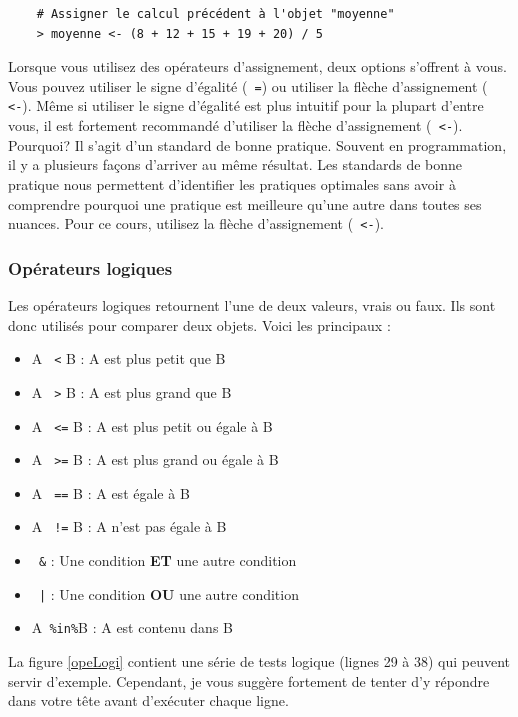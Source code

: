 \documentclass[10.5pt,a4paper]{article}
\newcommand{\rcode}[1]{\texttt{\color{rstudio} #1}}
\begin{document}
  \begin{lstlisting}
    # Assigner le calcul précédent à l'objet "moyenne"
    > moyenne <- (8 + 12 + 15 + 19 + 20) / 5
  \end{lstlisting}

Lorsque vous utilisez des opérateurs d'assignement, deux options s'offrent à vous. Vous pouvez utiliser le signe d'égalité (\rcode{=}) ou utiliser la flèche d'assignement (\rcode{<-}). Même si utiliser le signe d'égalité est plus intuitif pour la plupart d'entre vous, il est fortement recommandé d'utiliser la flèche d'assignement (\rcode{<-}). Pourquoi? Il s'agit d'un standard de bonne pratique. Souvent en programmation, il y a plusieurs façons d'arriver au même résultat. Les standards de bonne pratique nous permettent d'identifier les pratiques optimales sans avoir à comprendre pourquoi une pratique est meilleure qu'une autre dans toutes ses nuances. Pour ce cours, utilisez la flèche d'assignement (\rcode{<-}). 
    
    \subsubsection{Opérateurs logiques}
    Les opérateurs logiques retournent l'une de deux valeurs, vrais ou faux. Ils sont donc utilisés pour comparer deux objets. Voici les principaux : 
    \begin{itemize}
      \item A \rcode{<} B    : A est plus petit que B
      \item A \rcode{>} B    : A est plus grand que B
      \item A \rcode{<=} B   : A est plus petit ou égale à B
      \item A \rcode{>=} B   : A est plus grand ou égale à B
      \item A \rcode{==} B   : A est égale à B
      \item A \rcode{!=} B   : A n'est pas égale à B
      \item \rcode{\&}       : Une condition \textbf{ET} une autre condition
      \item \rcode{|}        : Une condition \textbf{OU} une autre condition
      \item A\rcode{\%in\%}B : A est contenu dans B
    \end{itemize}
    
    La figure \ref{opeLogi} contient une série de tests logique (lignes 29 à 38) qui peuvent servir d'exemple. Cependant, je vous suggère fortement de tenter d'y répondre dans votre tête avant d'exécuter chaque ligne. 
   
\end{document}
